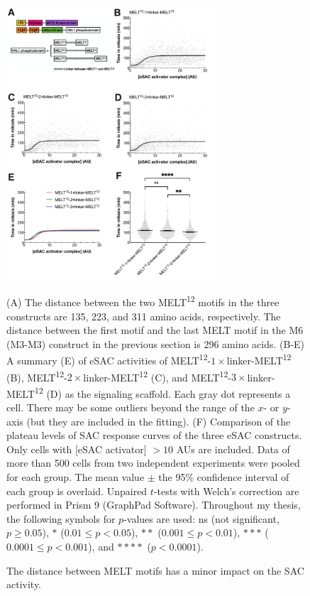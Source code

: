\begin{figure}
    \centering
    \includegraphics[width=0.7\textwidth]{chapters/figures/DistanceEffect.pdf}
    \caption{The distance between MELT motifs has a minor impact on the SAC activity.}
    \noindent\justifying (A) The distance between the two MELT\textsuperscript{12} motifs in the three constructs are 135, 223, and 311 amino acids, respectively. The distance between the first motif and the last MELT motif in the M6 (M3-M3) construct in the previous section is 296 amino acids. (B-E) A summary (E) of eSAC activities of MELT\textsuperscript{12}-$1\times$linker-MELT\textsuperscript{12} (B), MELT\textsuperscript{12}-$2\times$linker-MELT\textsuperscript{12} (C), and MELT\textsuperscript{12}-$3\times$linker-MELT\textsuperscript{12} (D) as the signaling scaffold. Each gray dot represents a cell. There may be some outliers beyond the range of the $x$- or $y$-axis (but they are included in the fitting).  (F) Comparison of the plateau levels of SAC response curves of the three eSAC constructs. Only cells with [eSAC activator] $> 10$ AUs are included. Data of more than 500 cells from two independent experiments were pooled for each group. %
    The mean value $\pm$ the 95\% confidence interval of each group is overlaid. Unpaired $t$-tests with Welch's correction are performed in Prism 9 (GraphPad Software). Throughout my thesis, the following symbols for $p$-values are used: ns (not significant, $p \geq 0.05$), ${\ast}$ ($0.01 \leq p < 0.05$), ${\ast}{\ast}$ ($0.001 \leq p < 0.01$), ${\ast}{\ast}{\ast}$ ($0.0001 \leq p < 0.001$), and ${\ast}{\ast}{\ast}{\ast}$ ($p < 0.0001$).
    \label{DistanceEffect}
\end{figure}

